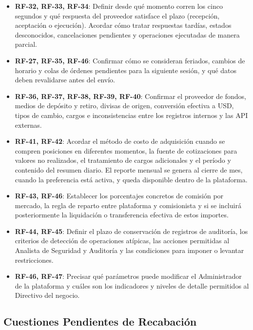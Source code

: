 \documentclass[11pt,a4paper,oneside]{article}
\begin{document}
\begin{itemize}
\item \textbf{RF-32, RF-33, RF-34}: Definir desde qué momento corren
  los cinco segundos y qué respuesta del proveedor satisface el plazo
  (recepción, aceptación o ejecución). Acordar cómo tratar respuestas
  tardías, estados desconocidos, cancelaciones pendientes y operaciones
  ejecutadas de manera parcial.

\item \textbf{RF-27, RF-35, RF-46}: Confirmar cómo se consideran
  feriados, cambios de horario y colas de órdenes pendientes para la
  siguiente sesión, y qué datos deben revalidarse antes del envío.

\item \textbf{RF-36, RF-37, RF-38, RF-39, RF-40}: Confirmar el
  proveedor de fondos, medios de depósito y retiro, divisas de origen,
  conversión efectiva a USD, tipos de cambio, cargos e inconsistencias
  entre los registros internos y las API externas.

\item \textbf{RF-41, RF-42}: Acordar el método de costo de adquisición
  cuando se compren posiciones en diferentes momentos, la fuente de
  cotizaciones para valores no realizados, el tratamiento de cargos
  adicionales y el período y contenido del resumen diario. El reporte
  mensual se genera al cierre de mes, cuando la preferencia está activa,
  y queda disponible dentro de la plataforma.

\item \textbf{RF-43, RF-46}: Establecer los porcentajes concretos de
  comisión por mercado, la regla de reparto entre plataforma y
  comisionista y si se incluirá posteriormente la liquidación o
  transferencia efectiva de estos importes.

\item \textbf{RF-44, RF-45}: Definir el plazo de conservación de
  registros de auditoría, los criterios de detección de operaciones
  atípicas, las acciones permitidas al Analista de Seguridad y
  Auditoría y las condiciones para imponer o levantar restricciones.

\item \textbf{RF-46, RF-47}: Precisar qué parámetros puede modificar
  el Administrador de la plataforma y cuáles son los indicadores y
  niveles de detalle permitidos al Directivo del negocio.

\end{itemize}


\subsection{Cuestiones Pendientes de Recabación}
\end{document}
